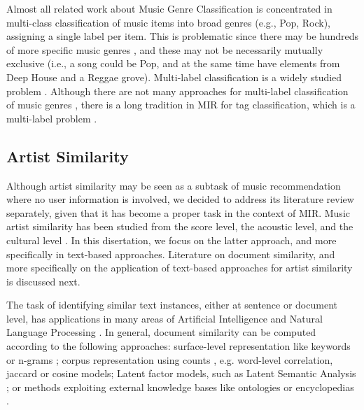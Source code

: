 Almost all related work about Music Genre Classification is concentrated in multi-class classification of music items into broad genres (e.g., Pop, Rock), assigning a single label per item. This is problematic since there may be hundreds of more specific music genres \citep{pachet2000taxonomy}, and these may not be necessarily mutually exclusive (i.e., a song could be Pop, and at the same time have elements from Deep House and a Reggae grove). 
Multi-label classification is a widely studied problem \citep{tsoumakas2006multi,jain2016extreme}. 
Although there are not many approaches for multi-label classification of music genres \citep{Sanden2011,wang2009tag}, there is a long tradition in MIR for tag classification, which is a multi-label problem \citep{Choi2016,wang2009tag}.


\subsection{Artist Similarity}
\label{sec:SOA:mir:similarity}

Although artist similarity may be seen as a subtask of music recommendation where no user information is involved, we decided to address its literature review separately, given that it has become a proper task in the context of MIR.
Music artist similarity has been studied from the score level, the acoustic level, and the cultural level \citep{Ellis2002}. In this disertation, we focus on the latter approach, and more specifically in text-based approaches. Literature on document similarity, and more specifically on the application of text-based approaches for artist similarity is discussed next.

The task of identifying similar text instances, either at sentence or document level, has applications in many areas of Artificial Intelligence and Natural Language Processing \citep{LiuandWang2014}. In general, document similarity can be computed according to the following approaches: surface-level representation like keywords or n-grams \citep{ChimandDeng2008}; corpus representation using counts \citep{Rorvig1999}, e.g. word-level correlation, jaccard or cosine models; Latent factor models, such as Latent Semantic Analysis \citep{Deerwesteretal1990}; or methods exploiting external knowledge bases like ontologies or encyclopedias \citep{Huetal2009}.

